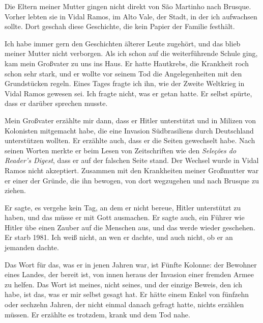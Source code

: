 \documentclass[
  ngerman,
  11pt,
  openany]{book}
\begin{document}
Die Eltern meiner Mutter gingen nicht direkt von São Martinho nach
Brusque. Vorher lebten sie in Vidal Ramos, im Alto Vale, der Stadt, in
der ich aufwachsen sollte. Dort geschah diese Geschichte, die kein
Papier der Familie festhält.

Ich habe immer gern den Geschichten älterer Leute zugehört, und das
blieb meiner Mutter nicht verborgen. Als ich schon auf die
weiterführende Schule ging, kam mein Großvater zu uns ins Haus. Er hatte
Hautkrebs, die Krankheit roch schon sehr stark, und er wollte vor seinem
Tod die Angelegenheiten mit den Grundstücken regeln. Eines Tages fragte
ich ihn, wie der Zweite Weltkrieg in Vidal Ramos gewesen sei. Ich fragte
nicht, was er getan hatte. Er selbst spürte, dass er darüber sprechen
musste.

Mein Großvater erzählte mir dann, dass er Hitler unterstützt und in
Milizen von Kolonisten mitgemacht habe, die eine Invasion Südbrasiliens
durch Deutschland unterstützen wollten. Er erzählte auch, dass er die
Seiten gewechselt habe. Nach seinen Worten merkte er beim Lesen von
Zeitschriften wie den \emph{Seleções do Reader's Digest}, dass er auf
der falschen Seite stand. Der Wechsel wurde in Vidal Ramos nicht
akzeptiert. Zusammen mit den Krankheiten meiner Großmutter war er einer
der Gründe, die ihn bewogen, von dort wegzugehen und nach Brusque zu
ziehen.

Er sagte, es vergehe kein Tag, an dem er nicht bereue, Hitler
unterstützt zu haben, und das müsse er mit Gott ausmachen. Er sagte
auch, ein Führer wie Hitler übe einen Zauber auf die Menschen aus, und
das werde wieder geschehen. Er starb 1981. Ich weiß nicht, an wen er
dachte, und auch nicht, ob er an jemanden dachte.

Das Wort für das, was er in jenen Jahren war, ist Fünfte Kolonne: der
Bewohner eines Landes, der bereit ist, von innen heraus der Invasion
einer fremden Armee zu helfen. Das Wort ist meines, nicht seines, und
der einzige Beweis, den ich habe, ist das, was er mir selbst gesagt hat.
Er hätte einem Enkel von fünfzehn oder sechzehn Jahren, der nicht einmal
danach gefragt hatte, nichts erzählen müssen. Er erzählte es trotzdem,
krank und dem Tod nahe.
\end{document}
